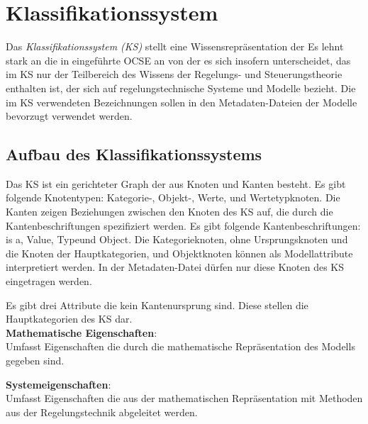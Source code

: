 \section{Klassifikationssystem}
\label{Ch:Ergebnisse:Sec:KS}
Das \textit{Klassifikationssystem (KS)} stellt eine Wissensrepräsentation der  Es lehnt stark an die in \cite{KNHE20a} eingeführte OCSE an von der es sich insofern unterscheidet, das im KS nur der Teilbereich des Wissens der Regelungs- und Steuerungstheorie enthalten ist, der sich auf regelungstechnische Systeme und Modelle bezieht. Die im KS verwendeten Bezeichnungen sollen in den Metadaten-Dateien der Modelle bevorzugt verwendet werden. 

\subsection{Aufbau des Klassifikationssystems}
\label{Ch:Ergebniss:Sec:KS:SubSec:Aufbau}
Das KS ist ein gerichteter Graph der aus Knoten und Kanten besteht. Es gibt folgende Knotentypen: Kategorie-, Objekt-, Werte, und Wertetypknoten. 
Die Kanten zeigen Beziehungen zwischen den Knoten des KS auf, die durch die Kantenbeschriftungen spezifiziert werden. Es gibt folgende Kantenbeschriftungen: \glqq is a\grqq, \glqq Value\grqq, \glqq Type\grqq und \glqq Object\grqq. Die Kategorieknoten, ohne Ursprungsknoten und die Knoten der Hauptkategorien, und Objektknoten können als Modellattribute interpretiert werden. In der Metadaten-Datei dürfen nur diese Knoten des KS eingetragen werden.

Es gibt drei Attribute die kein Kantenursprung sind. Diese stellen die Hauptkategorien des KS dar. 
\\
\textbf{Mathematische Eigenschaften}: \\
Umfasst Eigenschaften die durch die mathematische Repräsentation des Modells gegeben sind. %

\textbf{Systemeigenschaften}: \\ %
Umfasst Eigenschaften die aus der mathematischen Repräsentation mit Methoden aus der Regelungstechnik abgeleitet werden.

